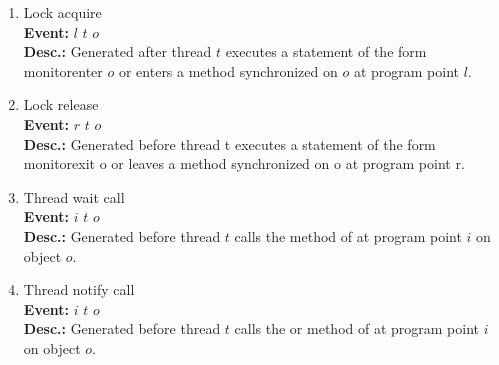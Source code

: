 \begin{enumerate}
\item
Lock acquire \\
{\bf Event:}  $l$ $t$ $o$ \\
{\bf Desc.:} Generated after thread $t$ executes a statement of the form monitorenter $o$ or enters a method synchronized on $o$ at program point $l$.

\item
Lock release \\
{\bf Event:}  $r$ $t$ $o$ \\
{\bf Desc.:} Generated before thread t executes a statement of the form monitorexit o or leaves a method synchronized on o at program point r.

\item
Thread wait call \\
{\bf Event:}  $i$ $t$ $o$ \\
{\bf Desc.:} Generated before thread $t$ calls the  method of  at program point $i$ on object $o$.

\item
Thread notify call \\
{\bf Event:}  $i$ $t$ $o$ \\
{\bf Desc.:} Generated before thread $t$ calls the  or  method of  at program point $i$ on object $o$.
\end{enumerate}
